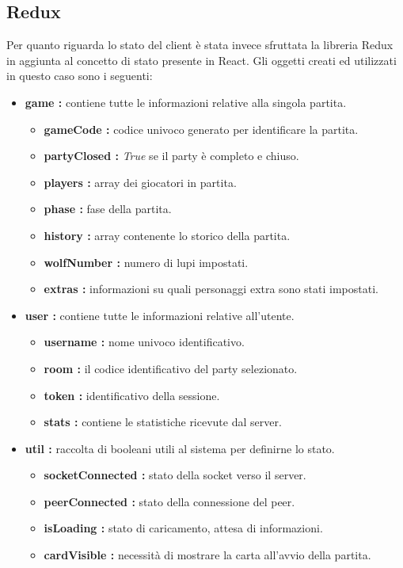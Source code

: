 \subsection{Redux}
Per quanto riguarda lo stato del client è stata invece sfruttata la libreria Redux in aggiunta al concetto di stato presente in React. Gli oggetti creati ed utilizzati in questo caso sono i seguenti:
\begin{itemize}
    \item \textbf{game :} contiene tutte le informazioni relative alla singola partita.
        \begin{itemize}
            \item \textbf{gameCode :} codice univoco generato per identificare la partita.
            \item \textbf{partyClosed :} \emph{True} se il party è completo e chiuso.
            \item \textbf{players :} array dei giocatori in partita.
            \item \textbf{phase :} fase della partita.
            \item \textbf{history :} array contenente lo storico della partita.
            \item \textbf{wolfNumber :} numero di lupi impostati.
            \item \textbf{extras :} informazioni su quali personaggi extra sono stati impostati.
        \end{itemize}
    \item \textbf{user :} contiene tutte le informazioni relative all'utente.
        \begin{itemize}
            \item \textbf{username :} nome univoco identificativo.
            \item \textbf{room :} il codice identificativo del party selezionato.
            \item \textbf{token :} identificativo della sessione.
            \item \textbf{stats :} contiene le statistiche ricevute dal server.
        \end{itemize}
    \item \textbf{util :} raccolta di booleani utili al sistema per definirne lo stato.
        \begin{itemize}
            \item \textbf{socketConnected :} stato della socket verso il server.
            \item \textbf{peerConnected :} stato della connessione del peer.
            \item \textbf{isLoading :} stato di caricamento, attesa di informazioni.
            \item \textbf{cardVisible :} necessità di mostrare la carta all'avvio della partita.
        \end{itemize}
\end{itemize}

